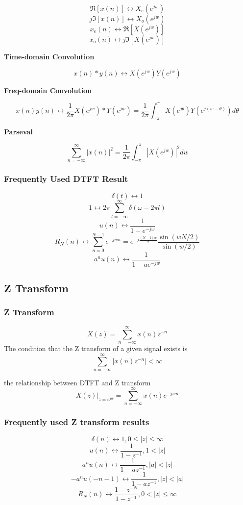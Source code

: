 \[ \Re[x(n)] \leftrightarrow X_e(e^{jw}) \]
\[ j\Im[x(n)] \leftrightarrow X_o(e^{jw}) \]
\[ x_e(n) \leftrightarrow \Re[X(e^{jw})] \]
\[ x_o(n) \leftrightarrow j\Im[X(e^{jw})] \]

{\bf Time-domain Convolution}

\[ x(n)*y(n) \leftrightarrow X(e^{jw}) Y(e^{jw})\]

{\bf Freq-domain Convolution}

\[ x(n)y(n) \leftrightarrow \frac{1}{2\pi} X(e^{jw}) * Y(e^{jw}) 
	= \frac{1}{2\pi} \int_{-\pi}^\pi X(e^{j\theta}) Y(e^{j(w - \theta)}) d\theta \]

{\bf Parseval}

\[ \sum_{n=-\infty}^\infty |x(n)|^2 = \frac{1}{2\pi} \int_{-\pi}^\pi |X(e^{jw})|^2 dw\]

\subsubsection{Frequently Used DTFT Result}
\[ \delta(t) \leftrightarrow 1 \]
\[ 1 \leftrightarrow 2\pi \sum_{l=-\infty}^\infty \delta(\omega - 2\pi l) \]
\[ u(n) \leftrightarrow \frac{1}{1-e^{-jw}} \]
\[ R_N(n) \leftrightarrow \sum_{n=0}^{N-1} e^{-jwn} = e^{-j\frac{(N-1)w}{2}} \frac{\sin(wN/2)}{\sin(w/2)} \]
\[ a^n u(n) \leftrightarrow \frac{1}{1-ae^{-jw}} \]

\subsection{Z Transform}

\subsubsection{Z Transform}
\[ X(z) = \sum_{n=-\infty}^\infty x(n) z^{-n} \]
The condition that the Z transform of a given signal exists is
\[ \sum_{n=-\infty}^\infty | x(n) z^{-n} | < \infty \]

the relationship between DTFT and Z transform
\[ X(z) \big|_{z=e^{jw}} = \sum_{n=-\infty}^\infty x(n)e^{-jwn}  \]

\subsubsection{Frequently used Z transform results}

\[ \delta(n) \leftrightarrow 1, 0 \leq |z| \leq \infty \]
\[ u(n) \leftrightarrow \frac{1}{1-z^{-1}}, 1 < |z| \]
\[ a^n u(n) \leftrightarrow \frac{1}{1-az^{-1}}, |a| < |z| \]
\[ -a^n u(-n-1) \leftrightarrow \frac{1}{1-az^{-1}}, |z| < |a| \]
\[ R_N(n) \leftrightarrow \frac{1-z^{-N}}{1-z^{-1}}, 0 < |z| \leq \infty \]

